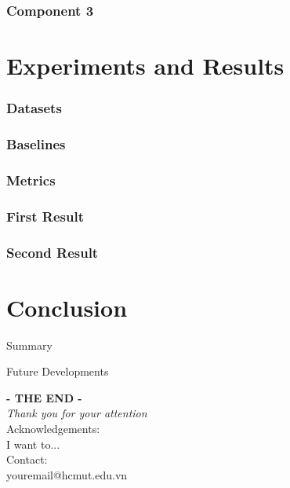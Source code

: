 \documentclass[aspectratio=169]{beamer}
\begin{document}
\begin{frame}
\frametitle{Component 3}

\end{frame}

\section{Experiments and Results}
\begin{frame}
\frametitle{Datasets}

\end{frame}

\begin{frame}
\frametitle{Baselines}


\end{frame}

\begin{frame}
\frametitle{Metrics}

\end{frame}

\begin{frame}
\frametitle{First Result}

\end{frame}

\begin{frame}
\frametitle{Second Result}

\end{frame}

\section{Conclusion}
\begin{frame}{Summary}

\end{frame}


\begin{frame}{Future Developments}

\end{frame}


\begin{frame}
    \centering
    \vspace{1cm}
    \textbf{\Huge{- THE END - }}\\
    \vspace{0.2cm}
    \textit{\Large{Thank you for your attention}}\\
    \vspace{15pt}
    Acknowledgements:\\
    I want to...\\
    \vspace{20pt}
    Contact:\\
    youremail@hcmut.edu.vn
\end{frame}

%         
%         
\end{document}
